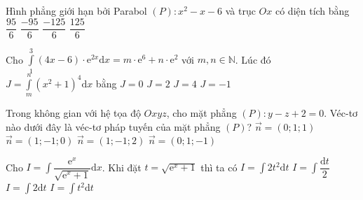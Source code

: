 \begin{ex}%
Hình phẳng giới hạn bởi Parabol $(P): x^2-x-6$ và trục $Ox$ có diện tích bằng
\choice
	{ $\dfrac{95}{6} $}
	{$\dfrac{-95}{6} $}
	{$\dfrac{-125}{6}$}
	{ \True $\dfrac{125}{6}$}
\end{ex}
\begin{ex}%
Cho $\displaystyle \int \limits_1^3 (4x-6) \cdot \mathrm{e}^{2x} \mathrm{d}x=m \cdot \mathrm{e}^6+n \cdot \mathrm{e}^2$  với $m,n \in \mathbb{N}$. Lúc đó $J=\displaystyle \int \limits_m^n (x^2+1)^4 \mathrm{d}x$ bằng
\choice
	{\True $J=0 $}
	{$J=2 $}
	{$J=4 $}
	{ $J=-1 $}
\end{ex}
\begin{ex}%
Trong không gian với hệ tọa độ $Oxyz$, cho mặt phẳng $(P)\colon  y-z+2=0$. Véc-tơ nào dưới đây là véc-tơ pháp tuyến của mặt phẳng $(P)$?
\choice
	{ $\vec{n}=(0;1;1) $}
	{$\vec{n}=(1;-1;0) $}
	{$\vec{n}=(1;-1;2) $}
	{\True  $\vec{n}=(0;1;-1) $}
\end{ex}

\begin{ex}%
Cho $I=\displaystyle \int \dfrac{\mathrm{e}^x}{\sqrt{ \mathrm{e}^x+1}} \mathrm{d}x$. Khi đặt $t=\sqrt{\mathrm{e}^x+1}$ thì ta có 
\choice
	{ $I=\displaystyle \int 2t^2\mathrm{d}t $}
	{$I=\displaystyle \int \dfrac{\mathrm{d}t}{2} $}
	{\True $I=\displaystyle \int 2 \mathrm{d}t $}
	{ $I=\displaystyle \int t^2 \mathrm{d}t $}
\end{ex}

